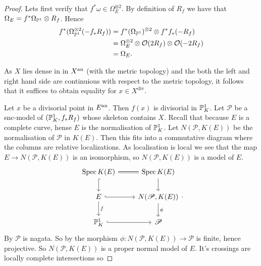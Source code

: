 \begin{proof}
	Lets first verify that $f^* \omega \in \Omega_E^{\otimes 2}$. 
	By definition of $R_f$ we have that $\Omega_E = f^*\Omega_{\mathbb{P} ^{1}} \otimes R_f$.
	Hence 
	\begin{align*}
		f^* (\Omega_{\mathbb{P}^{1}}^{\otimes 2}(-f_* R_f)) &= f^*(\Omega_{\mathbb{P}^{1}})^{\otimes 2} \otimes f^*f_*(-R_f) \\
							      &= \Omega_{E}^{\otimes 2} \otimes \mathcal{O}(2 R_f) \otimes \mathcal{O}(-2 R_f) \\
							      &= \Omega_E 
	.\end{align*}

	As $X$ lies dense in in $X{}^{\text{an}}$ (with the metric topology) and the both the left and right hand side are continuious with respect to the metric topology, it follows that it suffices to obtain equality for $x \in X^\text{div}$.

	Let $x$ be a divisorial point in $E{}^{\text{an}}$. 
	Then $f(x)$ is divisorial in $\mathbb{P}_K^{1}$. 
	Let $\mathscr{P} $ be a snc-model of $(\mathbb{P}_K^{1},f_* R_f)$ whose skeleton contains $X$.
	Recall that because $E$ is a complete curve, hense $E$ is the normalisation of $\mathbb{P}^{1}_K$.
	Let $N(\mathscr P, K(E))$ be the normalisation of $\mathscr P$ in $K(E)$. 
	Then this fits into a commutative diagram where the columns are relative localizations.
	As localisation is local we see that the map $E \to N(\mathscr P, K(E))$ is an isomorphism, so  $N(\mathscr P, K(E))$ is a model of $E$. 
	\[
	\begin{tikzcd}
		\spec K(E) \rar[equals] \dar[hookrightarrow]  & \spec K(E) \dar\\
		E \rar[hookrightarrow] \dar{f} & N(\mathscr P, K(E)) \dar{\phi} \\
		\pro^{1}_K \rar[hookrightarrow] & \mathscr P
	\end{tikzcd}
	.\] 
	By   $\mathscr P$ is nagata.
	So by  the morphism $\phi: N(\mathscr P, K(E)) \to \mathscr P$ is finite, hence projective. 
	So $N(\mathscr P, K(E))$ is a proper normal model of $E$. 
	It's crossings are locally complete intersections so  


\end{proof}

